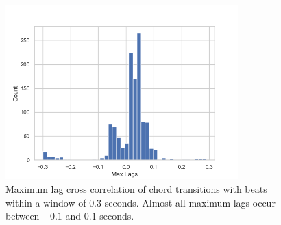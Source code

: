 \begin{figure}[H]
    \centering
    \includegraphics[width=0.8\textwidth]{figures/beats_max_lags.png}
    \caption{Maximum lag cross correlation of chord transitions with beats within a window of $0.3$ seconds. Almost all maximum lags occur between $-0.1$ and $0.1$ seconds.}\label{fig:maximum_lag_cross_correlation}
\end{figure}